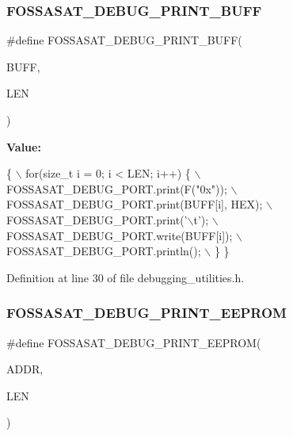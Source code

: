 \subsubsection{\texorpdfstring{F\+O\+S\+S\+A\+S\+A\+T\+\_\+\+D\+E\+B\+U\+G\+\_\+\+P\+R\+I\+N\+T\+\_\+\+B\+U\+FF}{FOSSASAT\_DEBUG\_PRINT\_BUFF}}
{\footnotesize\ttfamily \#define F\+O\+S\+S\+A\+S\+A\+T\+\_\+\+D\+E\+B\+U\+G\+\_\+\+P\+R\+I\+N\+T\+\_\+\+B\+U\+FF(\begin{DoxyParamCaption}\item[{}]{B\+U\+FF,  }\item[{}]{L\+EN }\end{DoxyParamCaption})}

{\bfseries Value\+:}
\begin{DoxyCode}
\{ \(\backslash\)
    for(\textcolor{keywordtype}{size\_t} i = 0; i < LEN; i++) \{ \(\backslash\)
      FOSSASAT\_DEBUG\_PORT.print(F(\textcolor{stringliteral}{"0x"})); \(\backslash\)
      FOSSASAT\_DEBUG\_PORT.print(BUFF[i], HEX); \(\backslash\)
      FOSSASAT\_DEBUG\_PORT.print(\textcolor{charliteral}{'\(\backslash\)t'}); \(\backslash\)
      FOSSASAT\_DEBUG\_PORT.write(BUFF[i]); \(\backslash\)
      FOSSASAT\_DEBUG\_PORT.println(); \(\backslash\)
    \} \}
\end{DoxyCode}


Definition at line 30 of file debugging\+\_\+utilities.\+h.

\mbox{\label{group__debugging__h__defines_ga70024289d51d1a6100dbee95b5f7d49a}} 
\subsubsection{\texorpdfstring{F\+O\+S\+S\+A\+S\+A\+T\+\_\+\+D\+E\+B\+U\+G\+\_\+\+P\+R\+I\+N\+T\+\_\+\+E\+E\+P\+R\+OM}{FOSSASAT\_DEBUG\_PRINT\_EEPROM}}
{\footnotesize\ttfamily \#define F\+O\+S\+S\+A\+S\+A\+T\+\_\+\+D\+E\+B\+U\+G\+\_\+\+P\+R\+I\+N\+T\+\_\+\+E\+E\+P\+R\+OM(\begin{DoxyParamCaption}\item[{}]{A\+D\+DR,  }\item[{}]{L\+EN }\end{DoxyParamCaption})}

